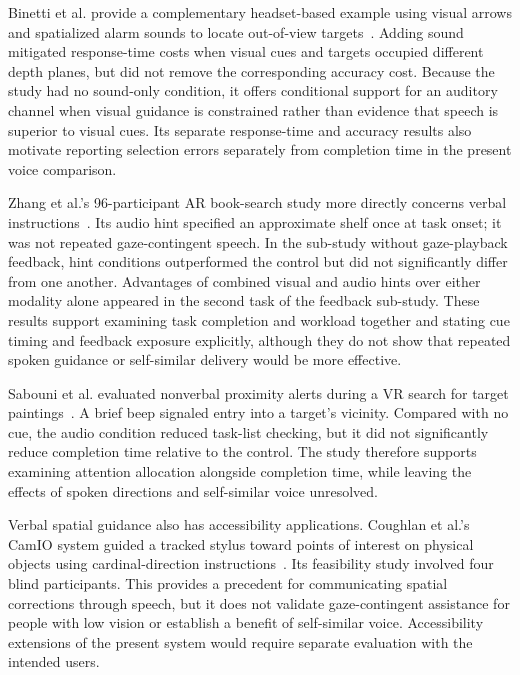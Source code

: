 Binetti et al. provide a complementary headset-based example using visual arrows and spatialized alarm sounds to locate out-of-view targets~\cite{binetti2021outofview}. Adding sound mitigated response-time costs when visual cues and targets occupied different depth planes, but did not remove the corresponding accuracy cost. Because the study had no sound-only condition, it offers conditional support for an auditory channel when visual guidance is constrained rather than evidence that speech is superior to visual cues. Its separate response-time and accuracy results also motivate reporting selection errors separately from completion time in the present voice comparison.

Zhang et al.'s 96-participant AR book-search study more directly concerns verbal instructions~\cite{zhang2023seehear}. Its audio hint specified an approximate shelf once at task onset; it was not repeated gaze-contingent speech. In the sub-study without gaze-playback feedback, hint conditions outperformed the control but did not significantly differ from one another. Advantages of combined visual and audio hints over either modality alone appeared in the second task of the feedback sub-study. These results support examining task completion and workload together and stating cue timing and feedback exposure explicitly, although they do not show that repeated spoken guidance or self-similar delivery would be more effective.

Sabouni et al. evaluated nonverbal proximity alerts during a VR search for target paintings~\cite{sabouni2025guidance}. A brief beep signaled entry into a target's vicinity. Compared with no cue, the audio condition reduced task-list checking, but it did not significantly reduce completion time relative to the control. The study therefore supports examining attention allocation alongside completion time, while leaving the effects of spoken directions and self-similar voice unresolved.

Verbal spatial guidance also has accessibility applications. Coughlan et al.'s CamIO system guided a tracked stylus toward points of interest on physical objects using cardinal-direction instructions~\cite{coughlan2020spatial}. Its feasibility study involved four blind participants. This provides a precedent for communicating spatial corrections through speech, but it does not validate gaze-contingent assistance for people with low vision or establish a benefit of self-similar voice. Accessibility extensions of the present system would require separate evaluation with the intended users.

